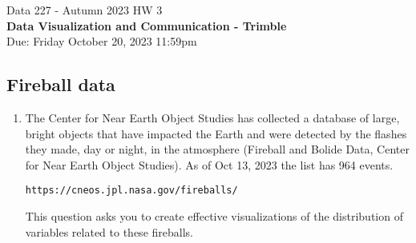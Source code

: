 \documentclass[]{book}
\theoremstyle{definition}
\begin{document}
\begin{center}
{\Large Data 227 - Autumn 2023 \hspace{0.5cm} HW 3}\\
\textbf{Data Visualization and Communication - Trimble}\\ %
Due: Friday October 20, 2023  11:59pm   
\end{center}

\vspace{0.2 cm}

\subsection*{Fireball data}

\begin{enumerate} 
\item\label{boldie}

The Center for Near Earth Object Studies has collected a database of large, bright objects that have impacted the Earth and were detected by the flashes they made, day or night, in the atmosphere (Fireball and Bolide Data, Center for Near Earth Object Studies). As of Oct 13, 2023 the list has 964 events.

\texttt{https://cneos.jpl.nasa.gov/fireballs/}

This question asks you to create effective visualizations of the distribution of variables related to these fireballs.


\end{enumerate}
\end{document}
